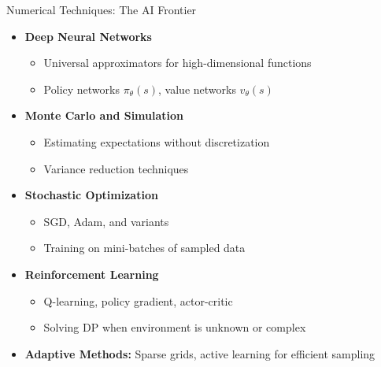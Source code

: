 \documentclass[10pt,english,aspectratio=169]{beamer}
\begin{document}
\begin{frame}{Numerical Techniques: The AI Frontier}
\begin{itemize}
\item \textbf{Deep Neural Networks}
\begin{itemize}
    \item Universal approximators for high-dimensional functions
    \item Policy networks $\pi_\theta(s)$, value networks $v_\theta(s)$
\end{itemize}

\medskip
\item \textbf{Monte Carlo and Simulation}
\begin{itemize}
    \item Estimating expectations without discretization
    \item Variance reduction techniques
\end{itemize}

\medskip
\item \textbf{Stochastic Optimization}
\begin{itemize}
    \item SGD, Adam, and variants
    \item Training on mini-batches of sampled data
\end{itemize}

\medskip
\item \textbf{Reinforcement Learning}
\begin{itemize}
    \item Q-learning, policy gradient, actor-critic
    \item Solving DP when environment is unknown or complex
\end{itemize}

\medskip
\item \textbf{Adaptive Methods:} Sparse grids, active learning for efficient sampling
\end{itemize}
\end{frame}
\end{document}
